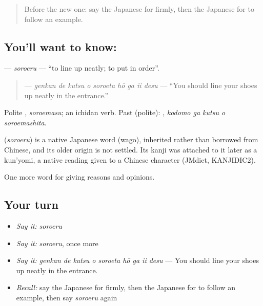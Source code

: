 \label{lesson:JA-C330-soroeru}



\begin{quote}
Before the new one: say the Japanese for firmly, then the Japanese for to follow an example.
\end{quote}

\subsection*{You'll want to know: }
\textbf{} — \emph{soroeru} — \textquotedblleft{}to line up neatly; to put in order\textquotedblright{}.

\begin{quote}
\textbf{    } — \emph{genkan de kutsu o soroeta hō ga ii desu} — \textquotedblleft{}You should line your shoes up neatly in the entrance.\textquotedblright{}
\end{quote}

Polite \textbf{}, \emph{soroemasu}; an ichidan verb. Past (polite): \textbf{  }, \emph{kodomo ga kutsu o soroemashita}.

\begin{cousinweb}
\textbf{} (\emph{soroeru}) is a native Japanese word (wago), inherited rather than borrowed from Chinese, and its older origin is not settled. Its kanji was attached to it later as a kun'yomi, a native reading given to a Chinese character (JMdict, KANJIDIC2).
\end{cousinweb}

\begin{grammarlens}[title={What you've built}]
One more word for giving reasons and opinions.
\end{grammarlens}

\subsection*{Your turn}
\begin{itemize}
\raggedright
  \item \emph{Say it:} \emph{soroeru}
  \item \emph{Say it:} \emph{soroeru}, once more
  \item \emph{Say it:} \emph{genkan de kutsu o soroeta hō ga ii desu} — You should line your shoes up neatly in the entrance.
  \item \emph{Recall:} say the Japanese for firmly, then the Japanese for to follow an example, then say \emph{soroeru} again
\end{itemize}

